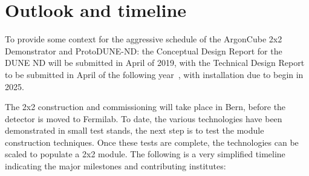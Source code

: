 \section{Outlook and timeline}
\label{sec:outlook}
To provide some context for the aggressive schedule of the ArgonCube 2x2 Demonstrator and ProtoDUNE-ND: the Conceptual Design Report for the DUNE ND will be submitted in April of 2019, with the Technical Design Report to be submitted in April of the following year~\cite{dune_dates}, with installation due to begin in 2025. 

The 2x2 construction and commissioning will take place in Bern, before the detector is moved to Fermilab. To date, the various technologies have been demonstrated in small test stands, the next step is to test the module construction techniques. Once these tests are complete, the technologies can be scaled to populate a 2x2 module. The following is a very simplified timeline indicating the major milestones and contributing institutes:      

